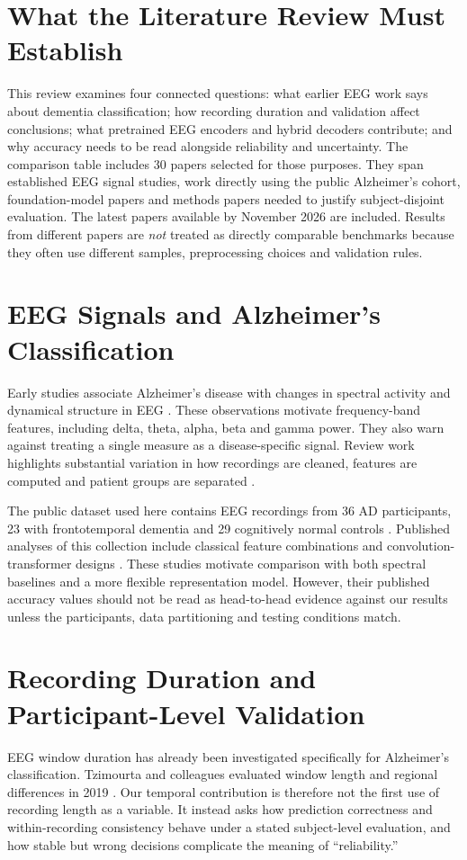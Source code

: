 \section{What the Literature Review Must Establish}
This review examines four connected questions: what earlier EEG work says about dementia classification; how recording duration and validation affect conclusions; what pretrained EEG encoders and hybrid decoders contribute; and why accuracy needs to be read alongside reliability and uncertainty. The comparison table includes 30 papers selected for those purposes. They span established EEG signal studies, work directly using the public Alzheimer's cohort, foundation-model papers and methods papers needed to justify subject-disjoint evaluation. The latest papers available by November 2026 are included. Results from different papers are \emph{not} treated as directly comparable benchmarks because they often use different samples, preprocessing choices and validation rules.

\section{EEG Signals and Alzheimer's Classification}
Early studies associate Alzheimer's disease with changes in spectral activity and dynamical structure in EEG \cite{jeong2004,dauwels2010}. These observations motivate frequency-band features, including delta, theta, alpha, beta and gamma power. They also warn against treating a single measure as a disease-specific signal. Review work highlights substantial variation in how recordings are cleaned, features are computed and patient groups are separated \cite{cassani2018,tzimourta2021review}.

The public dataset used here contains EEG recordings from 36 AD participants, 23 with frontotemporal dementia and 29 cognitively normal controls \cite{miltiadous2023dataset}. Published analyses of this collection include classical feature combinations and convolution-transformer designs \cite{zheng2023,dice2023}. These studies motivate comparison with both spectral baselines and a more flexible representation model. However, their published accuracy values should not be read as head-to-head evidence against our results unless the participants, data partitioning and testing conditions match.

\section{Recording Duration and Participant-Level Validation}
EEG window duration has already been investigated specifically for Alzheimer's classification. Tzimourta and colleagues evaluated window length and regional differences in 2019 \cite{tzimourta2019}. Our temporal contribution is therefore not the first use of recording length as a variable. It instead asks how prediction correctness and within-recording consistency behave under a stated subject-level evaluation, and how stable but wrong decisions complicate the meaning of ``reliability.''

